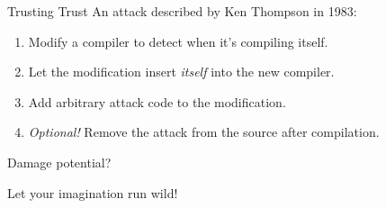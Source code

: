 \documentclass[12pt]{beamer}
\begin{document}

  \begin{frame}{Trusting Trust}
    An attack described by Ken Thompson in 1983:

    \begin{enumerate}
    \item Modify a compiler to detect when it's compiling itself.
    \item Let the modification insert \textit{itself} into the new compiler.
    \item Add arbitrary attack code to the modification.
    \item \textit{Optional!} Remove the attack from the source after compilation.
    \end{enumerate}
  \end{frame}

  \begin{frame}{Damage potential?}
    \begin{center}
      \large{Let your imagination run wild!}
    \end{center}
  \end{frame}
\end{document}
